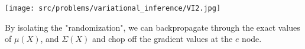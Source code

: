 \begin{Parts}
\begin{solution}

\begin{center}
\texttt{[image: src/problems/variational\_inference/VI2.jpg]}
\end{center}
By isolating the "randomization", we can backpropagate through the exact values of $ \mu(X) $, and $ \Sigma(X) $ and chop off the gradient values at the $ e $ node.

\end{solution}

\end{Parts}

